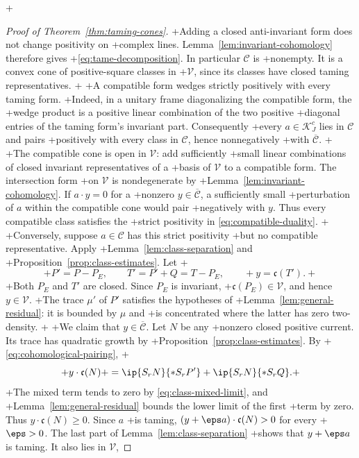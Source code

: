 +\begin{proof}[Proof of Theorem~\ref{thm:taming-cones}]
+Adding a closed anti-invariant form does not change positivity on
+complex lines. Lemma~\ref{lem:invariant-cohomology} therefore gives
+\eqref{eq:tame-decomposition}. In particular \(\mathcal C\) is
+nonempty. It is a convex cone of positive-square classes in
+\(\mathcal V\), since its classes have closed taming representatives.
+
+A compatible form wedges strictly positively with every taming form.
+Indeed, in a unitary frame diagonalizing the compatible form, the
+wedge product is a positive linear combination of the two positive
+diagonal entries of the taming form's invariant part. Consequently
+every \(a\in\mathcal K_J^c\) lies in \(\mathcal C\) and pairs
+positively with every class in \(\mathcal C\), hence nonnegatively
+with \(\overline{\mathcal C}\).
+
+The compatible cone is open in \(\mathcal V\): add sufficiently
+small linear combinations of closed invariant representatives of a
+basis of \(\mathcal V\) to a compatible form. The intersection form
+on \(\mathcal V\) is nondegenerate by
+Lemma~\ref{lem:invariant-cohomology}. If \(a\cdot y=0\) for a
+nonzero \(y\in\overline{\mathcal C}\), a sufficiently small
+perturbation of \(a\) within the compatible cone would pair
+negatively with \(y\). Thus every compatible class satisfies the
+strict positivity in \eqref{eq:compatible-duality}.
+
+Conversely, suppose \(a\in\mathcal C\) has this strict positivity
+but no compatible representative. Apply
+Lemma~\ref{lem:class-separation} and
+Proposition~\ref{prop:class-estimates}. Let
+\[
+ P'=P-P_E,\qquad T'=P'+Q=T-P_E,\qquad
+ y=\mathfrak c(T').
+\]
+Both \(P_E\) and \(T'\) are closed. Since \(P_E\) is invariant,
+\(\mathfrak c(P_E)\in\mathcal V\), and hence \(y\in\mathcal V\).
+The trace \(\mu'\) of \(P'\) satisfies the hypotheses of
+Lemma~\ref{lem:general-residual}: it is bounded by \(\mu\) and
+is concentrated where the latter has zero two-density.
+
+We claim that \(y\in\overline{\mathcal C}\). Let \(N\) be any
+nonzero closed positive current. Its trace has quadratic growth by
+Proposition~\ref{prop:class-estimates}. By
+\eqref{eq:cohomological-pairing},
+\[
+ y\cdot\mathfrak c(N)
+ =\ip{S_rN}{*S_rP'}+\ip{S_rN}{*S_rQ}.
+\]
+The mixed term tends to zero by \eqref{eq:class-mixed-limit}, and
+Lemma~\ref{lem:general-residual} bounds the lower limit of the first
+term by zero. Thus \(y\cdot\mathfrak c(N)\ge0\). Since \(a\)
+is taming, \((y+\eps a)\cdot\mathfrak c(N)>0\) for every
+\(\eps>0\). The last part of Lemma~\ref{lem:class-separation}
+shows that \(y+\eps a\) is taming. It also lies in \(\mathcal V\),

\end{proof}
